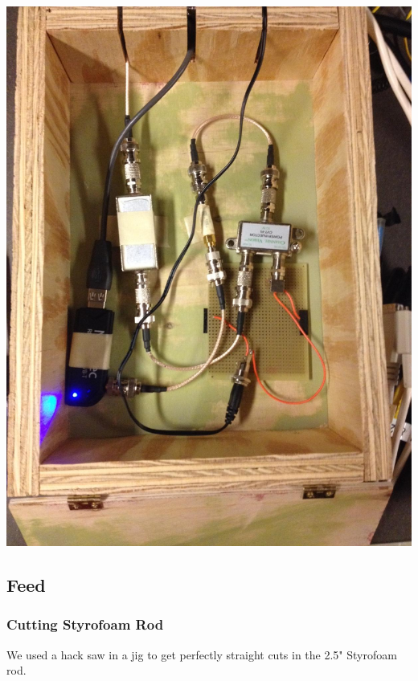 \documentclass[11pt]{article} %
\begin{document}
\begin{center}
\includegraphics[scale=0.20]{lnainterface/06.jpeg}
\end{center}



\subsection{Feed}

\subsubsection{Cutting Styrofoam Rod}
We used a hack saw in a jig to get perfectly straight cuts in the 2.5" Styrofoam rod. 
\end{document}
